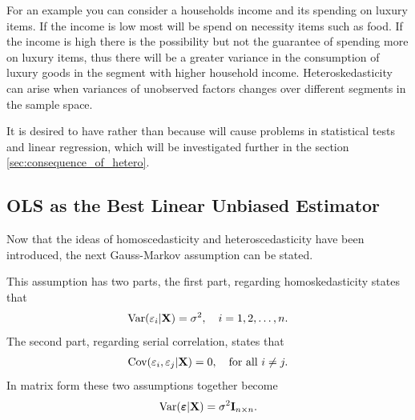 For an example you can consider a households income and its spending on luxury items. If the income is low most will be spend on necessity items such as food. If the income is high there is the possibility but not the guarantee of spending more on luxury items, thus there will be a greater variance in the consumption of luxury goods in the segment with higher household income. Heteroskedasticity can arise when variances of unobserved factors changes over different segments in the sample space. 

It is desired to have \homo rather than \hetero because \hetero will cause problems in statistical tests and linear regression, which will be investigated further in the section \ref{sec:consequence_of_hetero}. 

\subsection{OLS as the Best Linear Unbiased Estimator}
Now that the ideas of homoscedasticity and heteroscedasticity have been introduced, the next Gauss-Markov assumption can be stated.
\begin{assumption}\label{as:homoskedasticity_and_no_serial_correlation}
    This assumption has two parts, the first part, regarding homoskedasticity states that
    \begin{align*}
       \operatorname{\text{Var}}(\varepsilon_i | \mathbf{X}) = \sigma^2, \quad i = 1,2, \ldots, n.
    \end{align*}
    The second part, regarding serial correlation, states that
    \begin{align*}
        \operatorname{\text{Cov}}(\varepsilon_i, \varepsilon_j | \mathbf{X}) = 0, \quad \text{for all} \ i \neq j.
    \end{align*}
    In matrix form these two assumptions together become
    \begin{align*}
        \operatorname{\text{Var}}(\boldsymbol{\varepsilon} | \mathbf{X}) = \sigma^2\mathbf{I}_{n\times n}.
    \end{align*}
\end{assumption}

